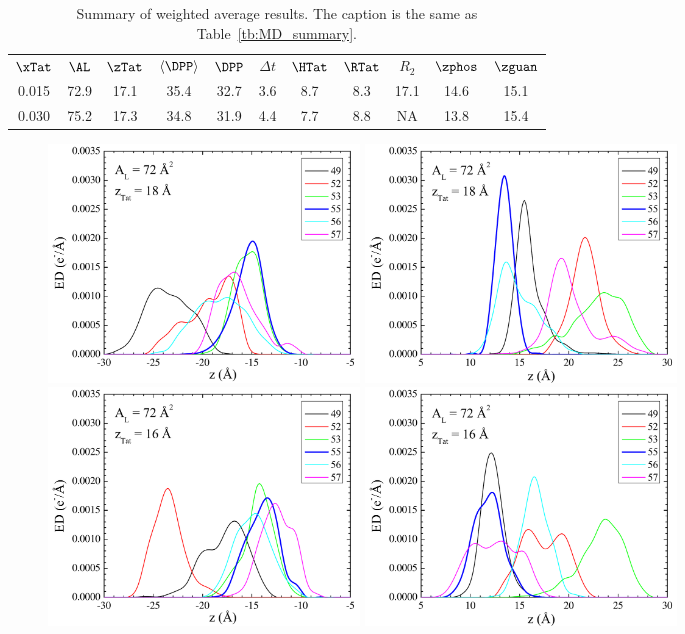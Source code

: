 \begin{table}
  \centering
  \begin{tabular}{c c c c c c c c c c c}
    $\xTat$ & $\AL$ & $\zTat$ & $\langle\DPP\rangle$ & $\DPP$ & $\Delta t$ & $\HTat$ & $\RTat$ & $R_2$ & $\zphos$ & $\zguan$ \\
    0.015 & 72.9 & 17.1 & 35.4 & 32.7 & 3.6 & 8.7 & 8.3 & 17.1 & 14.6 & 15.1 \\  
    0.030 & 75.2 & 17.3 & 34.8 & 31.9 & 4.4 & 7.7 & 8.8 & NA & 13.8 & 15.4
  \end{tabular}
  \caption{Summary of weighted average results. The caption is the same as
  Table~\ref{tb:MD_summary}.}
  \label{tb:MD_summary_avg}
\end{table}

\begin{figure}[htbp]
  \centering
  \includegraphics[width=0.4\textwidth]{figures/Tat/MD_Results/guanidinium/dopc-tat2_guan_72-0_L}
  \includegraphics[width=0.4\textwidth]{figures/Tat/MD_Results/guanidinium/dopc-tat2_guan_72-0_R}
  \includegraphics[width=0.4\textwidth]{figures/Tat/MD_Results/guanidinium/dopc-tat2_guan_72-1_L}
  \includegraphics[width=0.4\textwidth]{figures/Tat/MD_Results/guanidinium/dopc-tat2_guan_72-1_R}

\end{figure}
